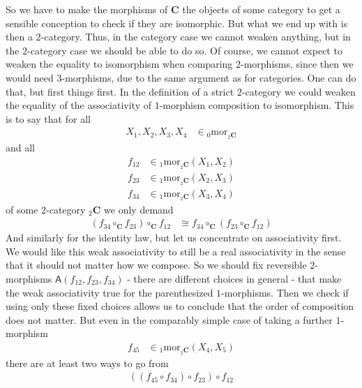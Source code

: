 So we have to make the morphisms of $\mathbf{C}$ the objects of some category to get a sensible conception to check if they are isomorphic.
But what we end up with is then a $2$-category.
Thus, in the category case we cannot weaken anything, but in the $2$-category case we should be able to do so.
Of course, we cannot expect to weaken the equality to isomorphism when comparing $2$-morphisms, since then we would need $3$-morphisms, due to the same argument as for categories.
One can do that, but first things first.
In the definition of a strict $2$-category we could weaken the equality of the associativity of $1$-morphism composition to isomorphism.
This is to say that for all
\begin{align*}
  X_{1},X_{2},X_{3},X_{4}
  &\in
  {}_{0}\mathrm{mor}_{{}_{2}\mathbf{C}}
\end{align*}
and all
\begin{align*}
  f_{12}
  &\in
  {}_{1}\mathrm{mor}_{{}_{2}\mathbf{C}}(X_{1},X_{2})
  \\
  f_{23}
  &\in
  {}_{1}\mathrm{mor}_{{}_{2}\mathbf{C}}(X_{2},X_{3})
  \\
  f_{34}
  &\in
  {}_{1}\mathrm{mor}_{{}_{2}\mathbf{C}}(X_{3},X_{4})
\end{align*}
of some $2$-category ${}_{2}\mathbf{C}$ we only demand
\begin{align*}
  \left(
    f_{34}
    \circ_{\mathbf{C}}
    f_{23}
  \right)
  \circ_{\mathbf{C}}
  f_{12}
  &\cong
  f_{34}
  \circ_{\mathbf{C}}
  \left(
    f_{23}
    \circ_{\mathbf{C}}
    f_{12}
  \right)
\end{align*}
And similarly for the identity law, but let us concentrate on associativity first.
We would like this weak associativity to still be a real associativity in the sense that it should not matter how we compose.
So we should fix reversible $2$-morphisms $\mathsf{A}(f_{12},f_{23},f_{34})$ - there are different choices in general - that make the weak associativity true for the parenthesized $1$-morphisms.
Then we check if using only these fixed choices allows us to conclude that the order of composition does not matter.
But even in the comparably simple case of taking a further $1$-morphism
\begin{align*}
  f_{45}
  &\in
  {}_{1}\mathrm{mor}_{{}_{2}\mathbf{C}}(X_{4},X_{5})
\end{align*}
there are at least two ways to go from
\begin{align*}
  \left(
    \left(
      f_{45}
      \circ
      f_{34}
    \right)
    \circ
    f_{23}
  \right)
  \circ
  f_{12}
\end{align*}
